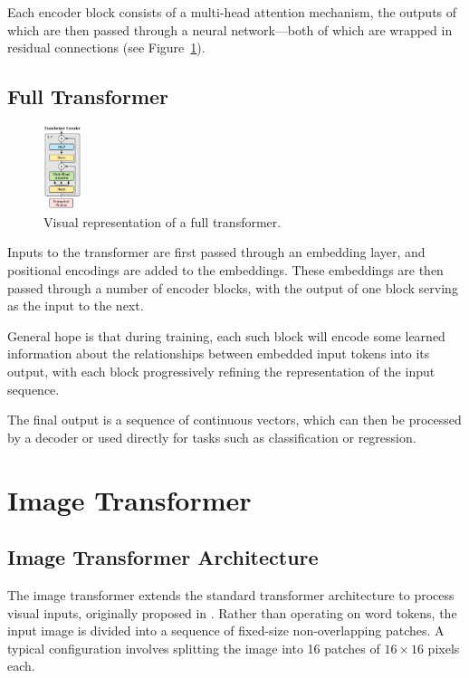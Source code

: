 \documentclass{pracalicmgr}
\begin{document}
Each encoder block consists of a multi-head attention mechanism, the outputs of which are then passed through a neural network—both of which are wrapped in residual connections (see Figure~\ref{fig:transformerEncoder}).

\subsection{Full Transformer} 

\begin{figure}[h]
    \centering
    \includegraphics[width=0.1\textwidth]{src/transformerEncoder.pdf}
    \caption{Visual representation of a full transformer. \cite{Vaswani2017Attention}}
    \label{fig:transformerEncoder}
\end{figure}

Inputs to the transformer are first passed through an embedding layer, and positional encodings are added to the embeddings. These embeddings are then passed through a number of encoder blocks, with the output of one block serving as the input to the next.

General hope is that during training, each such block will encode some learned information about the relationships between embedded input tokens into its output, with each block progressively refining the representation of the input sequence.

The final output is a sequence of continuous vectors, which can then be processed by a decoder or used directly for tasks such as classification or regression.

\section{Image Transformer}

\subsection{Image Transformer Architecture}

The image transformer extends the standard transformer architecture to process visual inputs, originally proposed in \cite{ViT}. Rather than operating on word tokens, the input image is divided into a sequence of fixed-size non-overlapping patches. A typical configuration involves splitting the image into 16 patches of \(16 \times 16\) pixels each. 
\end{document}
